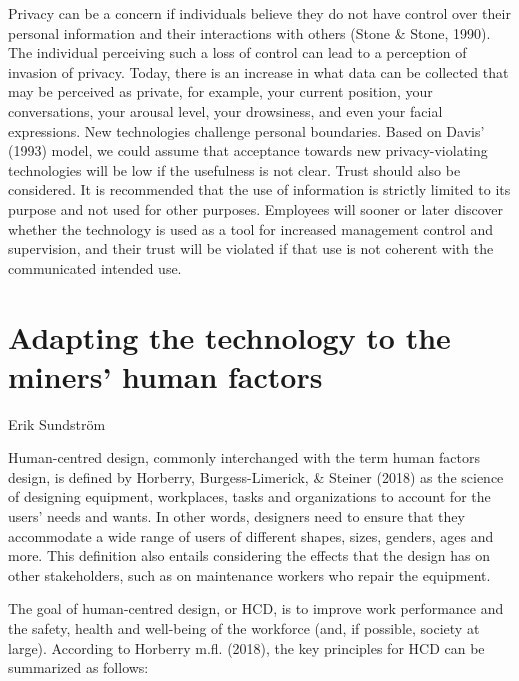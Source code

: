 \documentclass[
  12pt,
]{scrbook}
\newenvironment{chap-auth}
{\vspace{1cm}\begin{center}\begin{flushright}\sffamily\noindent}
  {\end{flushright}\end{center}\vspace{1cm}}
\begin{document}
Privacy can be a concern if individuals believe they do not have control over their personal information and their interactions with others (Stone \& Stone, 1990). The individual perceiving such a loss of control can lead to a perception of invasion of privacy. Today, there is an increase in what data can be collected that may be perceived as private, for example, your current position, your conversations, your arousal level, your drowsiness, and even your facial expressions. New technologies challenge personal boundaries. Based on Davis' (1993) model, we could assume that acceptance towards new privacy-violating technologies will be low if the usefulness is not clear. Trust should also be considered. It is recommended that the use of information is strictly limited to its purpose and not used for other purposes. Employees will sooner or later discover whether the technology is used as a tool for increased management control and supervision, and their trust will be violated if that use is not coherent with the communicated intended use.~

\hypertarget{adapting-the-technology-to-the-miners-human-factors}{%
\chapter{Adapting the technology to the miners' human factors}\label{adapting-the-technology-to-the-miners-human-factors}}

\begin{chap-auth}
Erik Sundström
\end{chap-auth}

Human-centred design, commonly interchanged with the term human factors design, is defined by Horberry, Burgess-Limerick, \& Steiner (2018) as the science of designing equipment, workplaces, tasks and organizations to account for the users' needs and wants. In other words, designers need to ensure that they accommodate a wide range of users of different shapes, sizes, genders, ages and more. This definition also entails considering the effects that the design has on other stakeholders, such as on maintenance workers who repair the equipment.

The goal of human-centred design, or HCD, is to improve work performance and the safety, health and well-being of the workforce (and, if possible, society at large). According to Horberry m.fl. (2018), the key principles for HCD can be summarized as follows:
\end{document}
